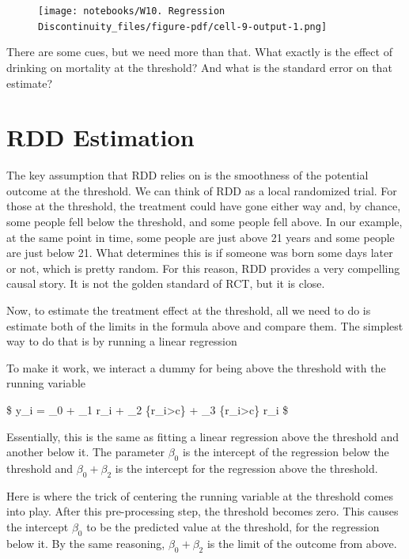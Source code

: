 \documentclass[
  letterpaper,
  DIV=11,
  numbers=noendperiod]{scrreprt}
\begin{document}
\begin{figure}[H]

{\centering \texttt{[image: notebooks/W10. Regression Discontinuity\_files/figure-pdf/cell-9-output-1.png]}

}

\end{figure}

There are some cues, but we need more than that. What exactly is the
effect of drinking on mortality at the threshold? And what is the
standard error on that estimate?

\hypertarget{rdd-estimation}{%
\section{RDD Estimation}\label{rdd-estimation}}

The key assumption that RDD relies on is the smoothness of the potential
outcome at the threshold. We can think of RDD as a local randomized
trial. For those at the threshold, the treatment could have gone either
way and, by chance, some people fell below the threshold, and some
people fell above. In our example, at the same point in time, some
people are just above 21 years and some people are just below 21. What
determines this is if someone was born some days later or not, which is
pretty random. For this reason, RDD provides a very compelling causal
story. It is not the golden standard of RCT, but it is close.

Now, to estimate the treatment effect at the threshold, all we need to
do is estimate both of the limits in the formula above and compare them.
The simplest way to do that is by running a linear regression

To make it work, we interact a dummy for being above the threshold with
the running variable

\$ y\_i = \beta\_0 + \beta\_1 r\_i + \beta\_2
\{r\_i\textgreater c\} + \beta\_3
\{r\_i\textgreater c\} r\_i \$

Essentially, this is the same as fitting a linear regression above the
threshold and another below it. The parameter \(\beta_0\) is the
intercept of the regression below the threshold and \(\beta_0+\beta_2\)
is the intercept for the regression above the threshold.

Here is where the trick of centering the running variable at the
threshold comes into play. After this pre-processing step, the threshold
becomes zero. This causes the intercept \(\beta_0\) to be the predicted
value at the threshold, for the regression below it. By the same
reasoning, \(\beta_0+\beta_2\) is the limit of the outcome from above.
\end{document}
